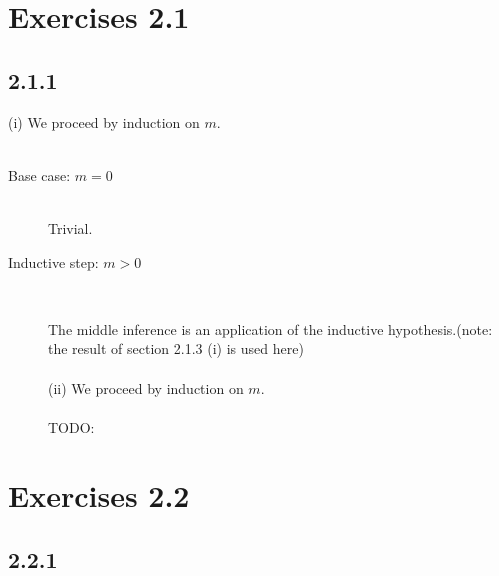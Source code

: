 \documentclass{article}
\begin{document}
\section*{Exercises 2.1}

\subsection*{2.1.1}

(i) We proceed by induction on $m$.\\~\\
\begin{description}

\item[Base case: $m = 0$]~\\

Trivial.

\item[Inductive step: $m > 0$]~\\

\begin{prooftree}

\end{prooftree}

The middle inference is an application of the inductive hypothesis.(note: the result of section 2.1.3 (i) is used here) \\~\\
(ii) We proceed by induction on $m$.\\~\\
TODO:

\end{description}

\section*{Exercises 2.2}

\subsection*{2.2.1}
\end{document}
